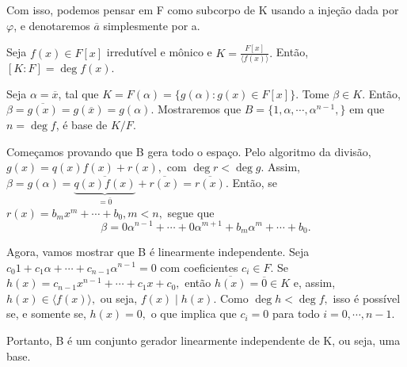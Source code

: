 \documentclass[AlgebraII/algebraII_notes.tex]{subfiles}
\begin{document}
Com isso, podemos pensar em F como subcorpo de K usando a injeção dada por \(\varphi \), e denotaremos \(\overline{a}\) simplesmente por a.
\begin{prop*}
	Seja \(f(x)\in F[x]\) irredutível e mônico e \(K = \frac{F[x]}{\langle f(x) \rangle}.\) Então, \([K:F] = \deg{f(x)}.\)
\end{prop*}
\begin{proof*}
	Seja \(\alpha  = \overline{x}\), tal que \(K = F(\alpha ) = \{g(\alpha ): g(x)\in F[x]\}.\) Tome \(\beta \in K.\) Então,
	\(\beta = \overline{g(x)} = g(\overline{x}) = g(\alpha ).\) Mostraremos que \(B = \{1, \alpha , \cdots, \alpha ^{n-1},\}\) em que
	\(n=\deg{f}\), é base de \(K/F.\)

	Começamos provando que B gera todo o espaço. Pelo algoritmo da divisão, \(g(x) = q(x)f(x) + r(x),\) com \(\deg{r} < \deg{g}.\)
	Assim, \(\beta  = g(\alpha ) = \underbrace{\overline{q(x)f(x)}}_{=\overline{0}} + \overline{r(x)} = \overline{r(x)}\).
	Então, se \(r(x) = b_{m}x^{m} + \cdots + b_{0}, m < n,\) segue que
	\[
		\beta = 0\alpha ^{n-1} + \cdots + 0\alpha ^{m+1} + b_{m}\alpha ^{m} + \cdots + b_{0}.
	\]

	Agora, vamos mostrar que B é linearmente independente. Seja \(c_{0}1 + c_{1}\alpha + \cdots + c_{n-1}\alpha ^{n-1} = 0\) com coeficientes
	\(c_{i}\in F.\) Se \(h(x) = c_{n-1}x^{n-1} + \cdots + c_{1}x + c_{0},\) então \(\overline{h(x)} = \overline{0}\in K\) e, assim,
	\(h(x)\in \langle f(x) \rangle,\) ou seja, \(f(x)\mid h(x).\) Como \(\deg{h} < \deg{f}, \) isso é possível se, e somente se, \(h(x) = 0,\) o
	que implica que \(c_{i} = 0\) para todo \(i=0, \cdots, n-1\).

	Portanto, B é um conjunto gerador linearmente independente de K, ou seja, uma base. \qedsymbol
\end{proof*}
\end{document}
